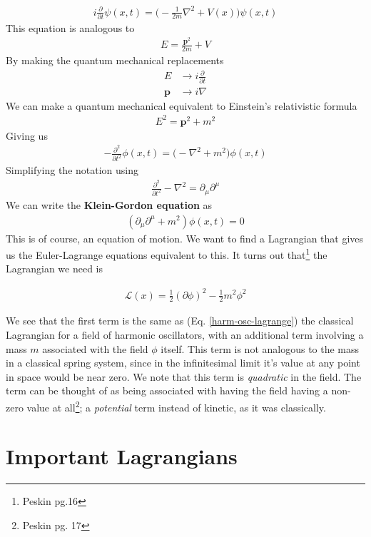 \begin{align}
i\frac{\partial}{\partial t}\psi(x,t) =\Big(-\frac{1}{2m}\nabla^2 + V(x)\Big)\psi(x,t)
\end{align}
This equation is analogous to
\begin{align}
E = \frac{\textbf{p}^2}{2m} + V
\end{align}
By making the quantum mechanical replacements
\begin{align}
E &\rightarrow i\frac{\partial}{\partial t}\\
\textbf{p} &\rightarrow i\nabla
\end{align}
We can make a quantum mechanical equivalent to Einstein's relativistic formula
\begin{align}
E^2 = \textbf{p}^2 + m^2
\end{align}
Giving us
\begin{align}
- \frac{\partial^2}{\partial t^2}\phi(x,t) = \Big(-\nabla^2 + m^2\Big)\phi(x,t)
\end{align}
Simplifying the notation using
\begin{align}
\frac{\partial^2}{\partial t^2} - \nabla^2 = \partial_\mu\partial^\mu
\end{align}
We can write the \textbf{Klein-Gordon equation} as 
\begin{align}
\boxed{(\partial_\mu\partial^\mu + m^2)\phi(x,t) = 0}
\end{align}
This is of course, an equation of motion. We want to find a Lagrangian that gives us the Euler-Lagrange equations equivalent to this. It turns out that\footnote{Peskin pg.16} the Lagrangian we need is

\begin{align}
\mathcal{L}(x) = \frac{1}{2}(\partial\phi)^2 - \frac{1}{2}m^2\phi^2
\end{align}

We see that the first term is the same as (Eq. \ref{harm-osc-lagrange}) the classical Lagrangian for a field of harmonic oscillators, with an additional term involving a mass $m$ associated with the field $\phi$ itself. This term is not analogous to the mass in a classical spring system, since in the infinitesimal limit it's value at any point in space would be near zero. We note that this term is \emph{quadratic} in the field. The term can be thought of as being associated with having the field having a non-zero value at all\footnote{Peskin pg. 17}; a \emph{potential} term instead of kinetic, as it was classically.

\section{Important Lagrangians}
